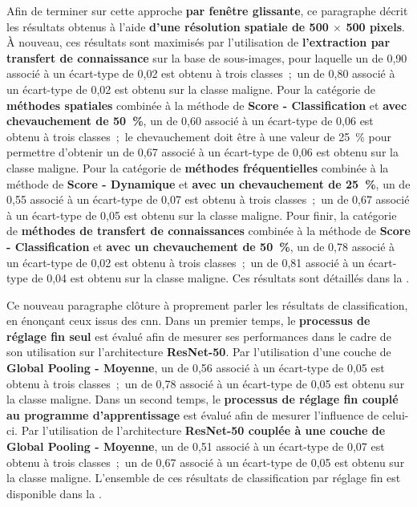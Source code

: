 Afin de terminer sur cette approche \textbf{par fenêtre glissante}, ce paragraphe décrit les résultats obtenus à l'aide \textbf{d'une résolution spatiale de 500 $\times$ 500 pixels}. À nouveau, ces résultats sont maximisés par l'utilisation de \textbf{l'extraction par transfert de connaissance} sur la base de sous-images, pour laquelle un \fscore{} de 0,90 associé à un écart-type de 0,02 est obtenu à trois classes~;~un \fscore{} de 0,80 associé à un écart-type de 0,02 est obtenu sur la classe maligne. Pour la catégorie de \textbf{méthodes spatiales} combinée à la méthode de \textbf{Score - Classification} et \textbf{avec chevauchement de 50~\%}, un \fscore{} de 0,60 associé à un écart-type de 0,06 est obtenu à trois classes~;~le chevauchement doit être à une valeur de 25~\% pour permettre d'obtenir un \fscore{} de 0,67 associé à un écart-type de 0,06 est obtenu sur la classe maligne. Pour la catégorie de \textbf{méthodes fréquentielles} combinée à la méthode de \textbf{Score - Dynamique} et \textbf{avec un chevauchement de 25~\%}, un \fscore{} de 0,55 associé à un écart-type de 0,07 est obtenu à trois classes~;~un \fscore{} de 0,67 associé à un écart-type de 0,05 est obtenu sur la classe maligne. Pour finir, la catégorie de \textbf{méthodes de transfert de connaissances} combinée à la méthode de \textbf{Score - Classification} et \textbf{avec un chevauchement de 50~\%}, un \fscore{} de 0,78 associé à un écart-type de 0,02 est obtenu à trois classes~;~un \fscore{} de 0,81 associé à un écart-type de 0,04 est obtenu sur la classe maligne. Ces résultats sont détaillés dans la .\par

Ce nouveau paragraphe clôture à proprement parler les résultats de classification, en énonçant ceux issus des \gls{cnn}. Dans un premier temps, le \textbf{processus de réglage fin seul} est évalué afin de mesurer ses performances dans le cadre de son utilisation sur l'architecture \textbf{ResNet-50}. Par l'utilisation d'une couche de \textbf{Global Pooling - Moyenne}, un \fscore{} de 0,56 associé à un écart-type de 0,05 est obtenu à trois classes~;~un \fscore{} de 0,78 associé à un écart-type de 0,05 est obtenu sur la classe maligne. Dans un second temps, le \textbf{processus de réglage fin couplé au programme d'apprentissage} est évalué afin de mesurer l'influence de celui-ci. Par l'utilisation de l'architecture \textbf{ResNet-50 couplée à une couche de Global Pooling - Moyenne}, un \fscore{} de 0,51 associé à un écart-type de 0,07 est obtenu à trois classes~;~un \fscore{} de 0,67 associé à un écart-type de 0,05 est obtenu sur la classe maligne. L'ensemble de ces résultats de classification par réglage fin est disponible dans la .\par

